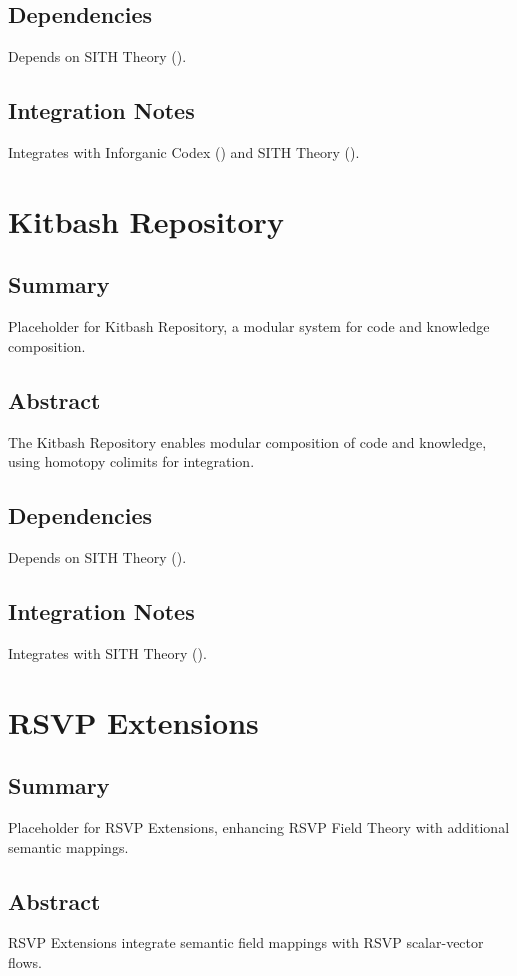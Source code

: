 \documentclass[11pt,oneside]{memoir}
\theoremstyle{plain}
\begin{document}
\section{Dependencies}
Depends on SITH Theory ().

\section{Integration Notes}
Integrates with Inforganic Codex () and SITH Theory ().

\chapter{Kitbash Repository}
\label{sec:kitbash}
\section{Summary}
Placeholder for Kitbash Repository, a modular system for code and knowledge composition.

\section{Abstract}
The Kitbash Repository enables modular composition of code and knowledge, using homotopy colimits for integration.

\section{Dependencies}
Depends on SITH Theory ().

\section{Integration Notes}
Integrates with SITH Theory ().

\chapter{RSVP Extensions}
\label{sec:rsvp_extensions}
\section{Summary}
Placeholder for RSVP Extensions, enhancing RSVP Field Theory with additional semantic mappings.

\section{Abstract}
RSVP Extensions integrate semantic field mappings with RSVP scalar-vector flows.
\end{document}

